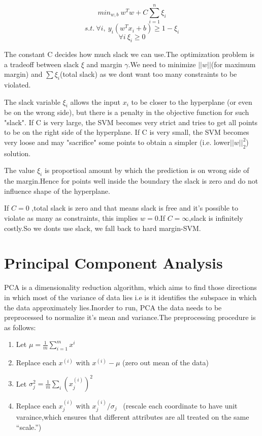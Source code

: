 \documentclass[12pt]{article}
\begin{document}
   $$min_{w,b} \  w^{T}w + C \sum_{i =1}^{n} \xi_{i}$$
   $$ s.t. \ \forall i, \ y_{i}(w^{T}x_{i} + b) \geq 1- \xi_{i}$$
   $$ \forall i \ \xi_{i} \geq 0$$ 
   
The constant C decides how much slack we can use.The optimization problem  is a tradeoff between slack $ \xi$ and margin $\gamma$.We need to minimize $\vert \vert w \vert \vert$(for maximum margin) and $\sum \xi_{i}$(total slack) as we dont want too many constraints to be violated.
  
 The slack variable $\xi_{i}$ allows the input $x_{i}$ to be closer to the hyperplane (or even be on the wrong side), but there is a penalty in the objective function for such "slack". If C is very large, the SVM becomes very strict and tries to get all points to be on the right side of the hyperplane. If C is very small, the SVM becomes very loose and may "sacrifice" some points to obtain a simpler (i.e. lower$ \vert \vert w \vert \vert_{2} ^{2}$) solution. 
 
 The value $\xi_{i}$ is proportioal amount by which the prediction is on wrong side of the margin.Hence for points well inside the boundary the slack is zero and do not influence shape of the hyperplane.
 
 If $C =0 $ ,total slack is zero and that means slack is free and it's possible to violate as many as constraints, this implies $w = 0$.If $C = \infty$,slack is infinitely costly.So we donts use slack, we fall back to hard margin-SVM. 
 
 \section{Principal Component Analysis}
PCA is a dimensionality reduction algorithm, which aims to find those directions in which most of the variance of data lies i.e is it  identifies the subspace in which the data approximately lies.Inorder to run, PCA the data needs to be preprocessed to normalize it's mean and variance.The preprocessing procedure is as follows:

\begin{enumerate}
	\item Let $\mu  = \frac{1}{m} \sum_{i=1}^{m}x^{i}$
	\item Replace each $x^{(i)}$ with $x^{(i)}-\mu$ (zero out mean of the data)
	\item Let $\sigma _{j}^{2} = \frac{1}{m} \sum_{i}(x_{j}^{(i)})^{2}$
	\item  Replace each $x_{j}^{(i)}$ with $x_{j}^{(i)} /  \sigma_{j}$ \ (rescale each coordinate to have unit varaince,which ensures that different attributes are all treated on the same
	“scale.”)
\end{enumerate}
\end{document}
